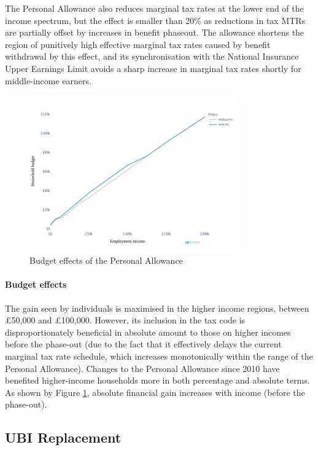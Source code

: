 \documentclass{article}
\begin{document}
    The Personal Allowance also reduces marginal tax rates at the lower end of the income spectrum, but the effect is smaller than 20\% as reductions in tax MTRs are partially offset by increases in benefit phaseout. The allowance shortens the region of punitively high effective marginal tax rates caused by benefit withdrawal by this effect, and its synchronisation with the National Insurance Upper Earnings Limit avoids a sharp increase in marginal tax rates shortly for middle-income earners.

    \begin{figure}
        \centering
        \includegraphics[width=0.8\textwidth]{images/fig_3.png}
        \caption{Budget effects of the Personal Allowance}
        \label{fig:PA_budget_effects}
    \end{figure}

    \paragraph{Budget effects} The gain seen by individuals is maximised in the higher income regions, between £50,000 and £100,000. However, its inclusion in the tax code is disproportionately beneficial in absolute amount to those on higher incomes before the phase-out (due to the fact that it effectively delays the current marginal tax rate schedule, which increases monotonically within the range of the Personal Allowance). Changes to the Personal Allowance since 2010 have benefited higher-income households more in both percentage and absolute terms.\cite{sterling_arnold} As shown by Figure \ref{fig:PA_budget_effects}, absolute financial gain increases with income (before the phase-out). 

    \subsection{UBI Replacement}
\end{document}
